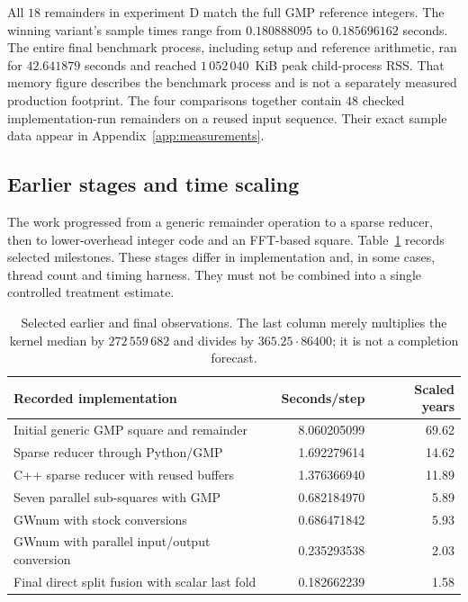 \documentclass[11pt,a4paper]{article}
\theoremstyle{definition}
\begin{document}
All $18$ remainders in experiment D match the full GMP reference integers.
The winning variant's sample times range from $0.180888095$ to
$0.185696162$ seconds. The entire final benchmark process, including
setup and reference arithmetic, ran for $42.641879$ seconds and reached
$1\,052\,040$~KiB peak child-process RSS. That memory figure describes
the benchmark process and is not a separately measured production footprint.
The four comparisons together contain $48$ checked implementation-run
remainders on a reused input sequence. Their exact sample data appear in
Appendix~\ref{app:measurements}.

\subsection{Earlier stages and time scaling}

The work progressed from a generic remainder operation to a sparse reducer,
then to lower-overhead integer code and an FFT-based square. Table~\ref{tab:history}
records selected milestones. These stages differ in implementation and, in
some cases, thread count and timing harness. They must not be combined into
a single controlled treatment estimate.

\begin{table}[htbp]
\centering\small
\caption{Selected earlier and final observations. The last column merely
multiplies the kernel median by $272\,559\,682$ and divides by
$365.25\cdot86400$; it is not a completion forecast.}
\label{tab:history}
\begin{tabularx}{\linewidth}{@{}X r r@{}}
\toprule
Recorded implementation & Seconds/step & Scaled years\\
\midrule
Initial generic GMP square and remainder & 8.060205099 & 69.62\\
Sparse reducer through Python/GMP & 1.692279614 & 14.62\\
C++ sparse reducer with reused buffers & 1.376366940 & 11.89\\
Seven parallel sub-squares with GMP & 0.682184970 & 5.89\\
GWnum with stock conversions & 0.686471842 & 5.93\\
GWnum with parallel input/output conversion & 0.235293538 & 2.03\\
Final direct split fusion with scalar last fold & 0.182662239 & 1.58\\
\bottomrule
\end{tabularx}
\end{table}
\end{document}
